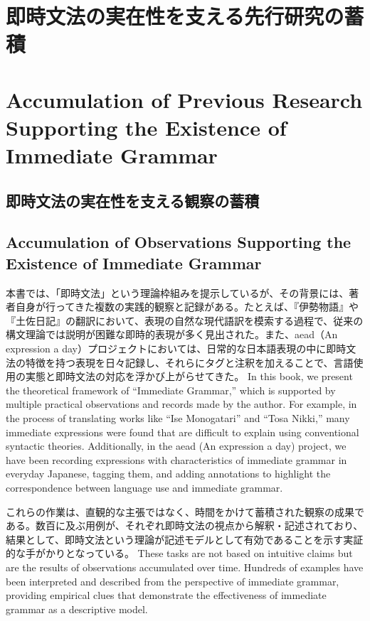 \ifJPN
\section{即時文法の実在性を支える先行研究の蓄積}
\else
\section{Accumulation of Previous Research Supporting the Existence of Immediate Grammar}
\fi
\label{sec:immediate_grammar_examples}

\ifJPN
\subsection{即時文法の実在性を支える観察の蓄積}
\else
\subsection{Accumulation of Observations Supporting the Existence of Immediate Grammar} 
\fi
\label{subsec:immediate_grammar_observations}

\ifJPN
本書では、「即時文法」という理論枠組みを提示しているが、その背景には、著者自身が行ってきた複数の実践的観察と記録がある。たとえば、『伊勢物語』や『土佐日記』の翻訳において、表現の自然な現代語訳を模索する過程で、従来の構文理論では説明が困難な即時的表現が多く見出された。また、aead（An expression a day）プロジェクトにおいては、日常的な日本語表現の中に即時文法の特徴を持つ表現を日々記録し、それらにタグと注釈を加えることで、言語使用の実態と即時文法の対応を浮かび上がらせてきた。
\else
In this book, we present the theoretical framework of ``Immediate Grammar,'' which is supported by multiple practical observations and records made by the author. For example, in the process of translating works like ``Ise Monogatari'' and ``Tosa Nikki,'' many immediate expressions were found that are difficult to explain using conventional syntactic theories. Additionally, in the aead (An expression a day) project, we have been recording expressions with characteristics of immediate grammar in everyday Japanese, tagging them, and adding annotations to highlight the correspondence between language use and immediate grammar.
\fi

\ifJPN
これらの作業は、直観的な主張ではなく、時間をかけて蓄積された観察の成果である。数百に及ぶ用例が、それぞれ即時文法の視点から解釈・記述されており、結果として、即時文法という理論が記述モデルとして有効であることを示す実証的な手がかりとなっている。
\else
These tasks are not based on intuitive claims but are the results of observations accumulated over time. Hundreds of examples have been interpreted and described from the perspective of immediate grammar, providing empirical clues that demonstrate the effectiveness of immediate grammar as a descriptive model.
\fi

